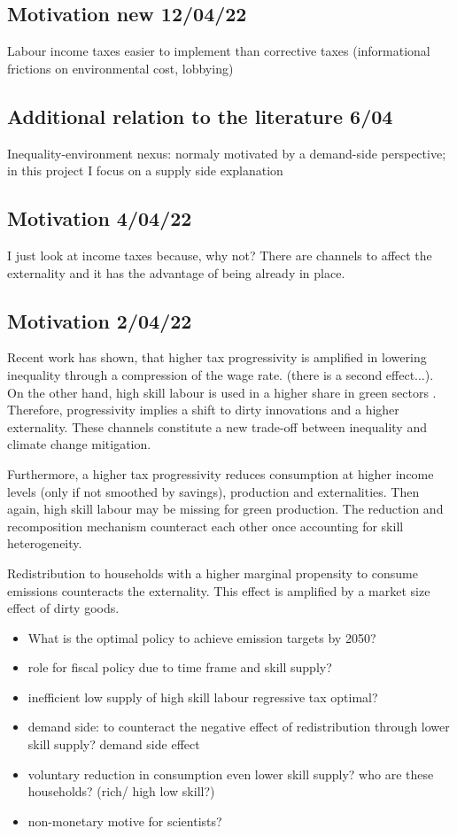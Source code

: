 
\subsection*{Motivation new 12/04/22}
Labour income taxes easier to implement than corrective taxes (informational frictions on environmental cost, lobbying)
\subsection*{Additional relation to the literature 6/04}
Inequality-environment nexus: normaly motivated by a demand-side perspective; in this project I focus on a supply side explanation

\subsection*{Motivation 4/04/22}
I just look at income taxes because, why not? There are channels to affect the externality and it has the advantage of being already in place. 

\subsection*{Motivation 2/04/22}
Recent work has shown, that  higher tax progressivity is amplified in lowering inequality through a compression of the wage rate. (there is a second effect...). On the other hand, high skill labour is used in a higher share in green sectors \cite{Consoli2016DoCapital}. Therefore, progressivity implies a shift to dirty innovations and a higher externality. These channels constitute a new trade-off between inequality and climate change mitigation. 

Furthermore, a higher tax progressivity reduces consumption at higher income levels (only if not smoothed by savings), production and externalities. Then again, high skill labour may be missing for green production. The reduction and recomposition mechanism counteract each other once accounting for skill heterogeneity. 

Redistribution to households with a higher marginal propensity to consume emissions counteracts the externality. This effect is amplified by a market size effect  of dirty goods. 

\begin{itemize}
	\item What is the optimal policy to achieve emission targets by 2050?
	\item role for fiscal policy due to time frame and skill supply?
	\item inefficient low supply of high skill labour \ar regressive tax optimal?
	\item demand side: to counteract the negative effect of redistribution through lower skill supply? \ar demand side effect
	\item voluntary reduction in consumption \ar even lower skill supply? \ar who are these households? (rich/ high low skill?)
	\item non-monetary motive for scientists? 
\end{itemize}

